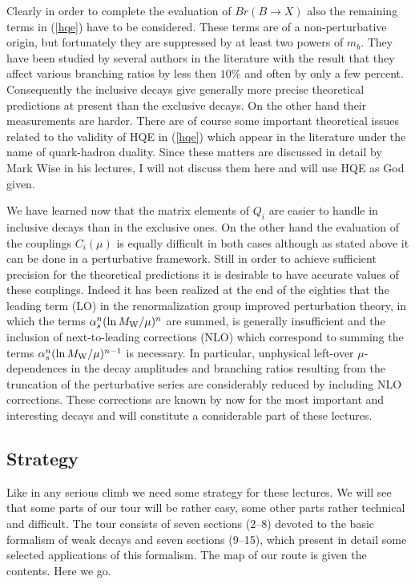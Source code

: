 \documentclass[12pt,rotate]{article}
\newcommand{\mw}{M_{\rm W}}
\begin{document}
Clearly in order to complete the evaluation of $Br(B\to X)$ also the 
remaining terms in
(\ref{hqe}) have to be considered. These terms are of a non-perturbative 
origin, but
fortunately they are suppressed by at least two powers of $m_b$. 
They have been
studied by several authors in the literature with the result that they affect
various branching ratios by less then $10\%$ and often by only a few percent.
Consequently the inclusive decays give generally more precise theoretical
predictions at present than the exclusive decays. On the other hand their
measurements are harder. There are of course some important theoretical
issues related to the validity of HQE in (\ref{hqe}) which appear in the 
literature under the name of quark-hadron duality. 
Since these matters are discussed in
detail by Mark Wise in his lectures, I will not discuss them here and will
use HQE as God given.

We have learned now that the matrix elements of $Q_i$ are easier to handle in
inclusive decays than in the exclusive ones. On the other hand the evaluation
of the couplings $C_i(\mu)$ is equally  difficult in both cases although 
as stated
above it can be done in a perturbative framework. Still in order to achieve
sufficient precision for the theoretical predictions it is desirable to have
accurate values of these couplings. Indeed it has been realized at the end of
the eighties
that the leading term (LO) in the renormalization group improved perturbation
theory, in which the terms $\alpha^n_s (\ln\mw/\mu)^n$ are summed, is 
generally insufficient and the
inclusion of next-to-leading corrections  (NLO) which correspond to summing
the terms $\alpha^n_s (\ln\mw/\mu)^{n-1}$ is necessary. 
In particular, unphysical left-over $\mu$-dependences
in the decay amplitudes and branching ratios resulting from the truncation of
the perturbative series are considerably reduced by including NLO
corrections. These corrections are known by now for the most important and
interesting decays and will constitute a considerable part of these lectures. 
\subsection{Strategy}
Like in any serious climb we need some strategy for these lectures. We will
see that some parts of our tour will be rather easy, some other parts rather
technical and difficult. 
The tour consists of seven sections (2--8) devoted to the basic formalism
of weak decays and seven sections (9--15), which present in detail some
selected applications of this formalism.
The map of our route is given the contents. Here we go.
\end{document}
